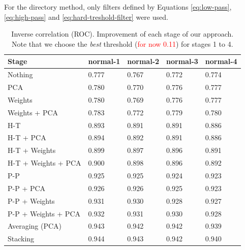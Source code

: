 \documentclass[wcp]{jmlr}
\begin{document}
For the directory method, only filters defined by Equations
\ref{eq:low-pass}, \ref{eq:high-pass} and \ref{eq:hard-treshold-filter} were
used.

\begin{table}[htb]
\centering
\caption{Inverse correlation (ROC). Improvement of each stage of our approach. Note that we choose the
         \textit{best} threshold (\textcolor{red}{for now 0.11}) for stages 1 to 4.}
\begin{tabular}{*{5}{l}}
\toprule
Stage               & normal-1 & normal-2 & normal-3 & normal-4 \\
\midrule
Nothing             & 0.777 & 0.767 & 0.772 & 0.774 \\
PCA                 & 0.780 & 0.770 & 0.776 & 0.777 \\
Weights             & 0.780 & 0.769 & 0.776 & 0.777 \\
Weights + PCA       & 0.783 & 0.772 & 0.779 & 0.780 \\
H-T                 & 0.893 & 0.891 & 0.891 & 0.886 \\
H-T + PCA           & 0.894 & 0.892 & 0.891 & 0.886 \\
H-T + Weights       & 0.899 & 0.897 & 0.896 & 0.891 \\
H-T + Weights + PCA & 0.900 & 0.898 & 0.896 & 0.892 \\
P-P                 & 0.925 & 0.925 & 0.924 & 0.923 \\
P-P + PCA           & 0.926 & 0.926 & 0.925 & 0.923 \\
P-P + Weights       & 0.931 & 0.930 & 0.928 & 0.927 \\
P-P + Weights + PCA & 0.932 & 0.931 & 0.930 & 0.928 \\
Averaging (PCA)     & 0.943 & 0.942 & 0.942 & 0.939 \\
Stacking            & 0.944 & 0.943 & 0.942 & 0.940 \\
\bottomrule
\end{tabular}
\end{table}
\end{document}

